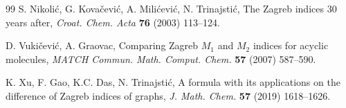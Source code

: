\documentclass[12pt]{article}
\begin{document}
\begin{thebibliography}{99}
  S. Nikoli\'c, G.  Kova\v{c}evi\'c, A.  Mili\'cevi\'c, N.  Trinajstić,  The Zagreb indices 30 years after, {\it Croat. Chem. Acta} \textbf{76} (2003)  113--124. 

 D. Vuki\v{c}evi\'c, A. Graovac, Comparing Zagreb $M_1$ and $M_2$ indices for acyclic molecules, {\it MATCH Commun. Math. Comput. Chem.} {\bf57} (2007) 587--590.
    
 K. Xu, F.  Gao, K.C.  Das, N.  Trinajsti\'c,  A formula with its applications on the difference of Zagreb indices of graphs, {\it J. Math. Chem.} {\bf 57} (2019)  1618--1626. 



\end{thebibliography}
\end{document}
